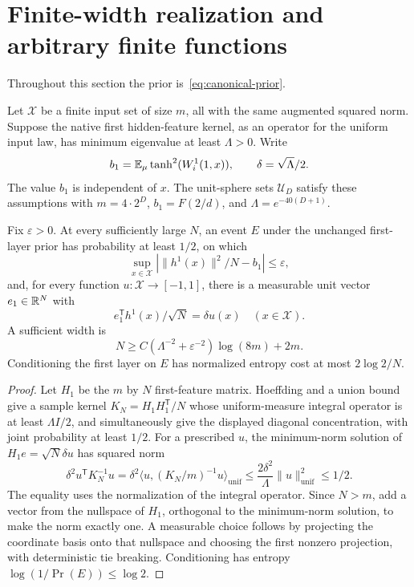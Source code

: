 \section{Finite-width realization and arbitrary finite functions}
\label{sec:spike-realization}
Throughout this section the prior is~\eqref{eq:canonical-prior}.

Let $\mathcal X$ be a finite input set of size $m$, all with the same augmented squared norm. Suppose the native first hidden-feature kernel, as an operator for the uniform input law, has minimum eigenvalue at least $\Lambda>0$. Write
\[
 b_1=\mathbb E_\mu\tanh^2(W^1_i(1,x)),\qquad
 \delta=\sqrt\Lambda/2.
\]
The value $b_1$ is independent of $x$. The unit-sphere sets $\mathcal U_D$ satisfy these assumptions with $m=4\cdot2^D$, $b_1=F(2/d)$, and $\Lambda=e^{-40(D+1)}$.

\begin{lemma}
\label{lem:unit-seed}
Fix $\varepsilon>0$. At every sufficiently large $N$, an event $E$ under the unchanged first-layer prior has probability at least $1/2$, on which
\[
 \sup_{x\in\mathcal X}|\|h^1(x)\|^2/N-b_1|\le\varepsilon,
\]
and, for every function $u:\mathcal X\to[-1,1]$, there is a measurable unit vector $e_1\in\mathbb R^N$ with
\[
 e_1^{\mathsf T}h^1(x)/\sqrt N=\delta u(x)
                     \quad(x\in\mathcal X).
\]
A sufficient width is
\[
 N\ge C(\Lambda^{-2}+\varepsilon^{-2})\log(8m)+2m.
\]
Conditioning the first layer on $E$ has normalized entropy cost at most $2\log2/N$.
\end{lemma}
\begin{proof}
Let $H_1$ be the $m$ by $N$ first-feature matrix. Hoeffding and a union bound give a sample kernel
$K_N=H_1H_1^{\mathsf T}/N$ whose uniform-measure integral operator is at least $\Lambda I/2$, and simultaneously give the displayed diagonal concentration, with joint probability at least $1/2$.
For a prescribed $u$, the minimum-norm solution of
$H_1e=\sqrt N\delta u$ has squared norm
\[
 \delta^2u^{\mathsf T}K_N^{-1}u
 =\delta^2\langle u,(K_N/m)^{-1}u\rangle_{\mathrm{unif}}
 \le\frac{2\delta^2}{\Lambda}\|u\|_{\mathrm{unif}}^2\le1/2.
\]
The equality uses the normalization of the integral operator. Since $N>m$, add a vector from the nullspace of $H_1$, orthogonal to the minimum-norm solution, to make the norm exactly one. A measurable choice follows by projecting the coordinate basis onto that nullspace and choosing the first nonzero projection, with deterministic tie breaking. Conditioning has entropy $\log(1/\Pr(E))\le\log2$.
\end{proof}

